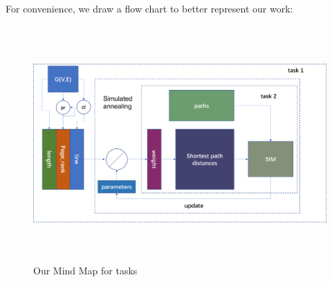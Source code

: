 \indent\indent For convenience, we draw a flow chart to better represent our work:
\begin{figure}[H]
    \centering
    \includegraphics[width=12cm,height=9cm]{核心思路.png}
    \caption{Our Mind Map for tasks}
\end{figure}
